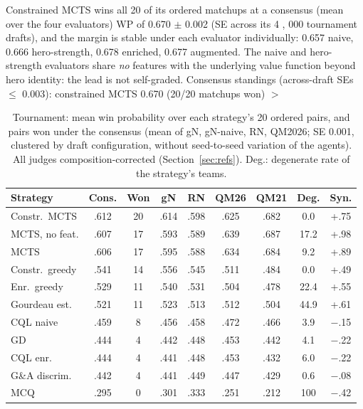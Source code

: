 \documentclass[journal]{IEEEtran}
\providecommand{\DIFaddtex}[1]{{\protect\color{blue} \sf #1}} %
\providecommand{\DIFdeltex}[1]{{\protect\color{red} \scriptsize #1}} %
\providecommand{\DIFaddbegin}{} %
\providecommand{\DIFdelbegin}{} %
\providecommand{\DIFdelend}{} %
\providecommand{\DIFaddFL}[1]{\DIFadd{#1}} %
\providecommand{\DIFadd}[1]{\texorpdfstring{\DIFaddtex{#1}}{#1}} %
\providecommand{\DIFdel}[1]{\texorpdfstring{\DIFdeltex{#1}}{}} %
\begin{document}
\DIFdelbegin \DIFdel{Constrained MCTS wins all 20 of its ordered matchups at a consensus (mean over the four evaluators) WP of 0.670 $\pm$ 0.002 (SE across its 4}%
\DIFdel{, }%
\DIFdel{000 tournament drafts), and the margin is stable under each evaluator individually: 0.657 naive, 0.666 hero-strength, 0.678 enriched, 0.677 augmented. The naive and hero-strength evaluators share \textit{no} features with the underlying value function beyond hero identity: the lead is not self-graded.
Consensus standings (across-draft SEs $\leq$ 0.003): constrained MCTS 0.670 (20/20 matchups won) $>$ }\DIFdelend \DIFaddbegin \begin{table}[t]
\centering
\caption{\DIFaddFL{Tournament: mean win probability over each strategy's 20 ordered pairs, and pairs won under the consensus (mean of gN, gN-naive, RN, QM2026; SE 0.001, clustered by draft configuration, without seed-to-seed variation of the agents). All judges composition-corrected (Section~\ref{sec:refs}). Deg.: degenerate rate of the strategy's teams.}}
\label{tab:tourn}
\setlength{\tabcolsep}{1.8pt}
\small
\begin{tabular}{lcccccccc}
\toprule
Strategy & Cons. & Won & gN & RN & QM26 & QM21 & Deg. & Syn. \\
\midrule
Constr.\ MCTS & .612 & 20 & .614 & .598 & .625 & .682 & 0.0 & +.75 \\
MCTS, no feat. & .607 & 17 & .593 & .589 & .639 & .687 & 17.2 & +.98 \\
MCTS & .606 & 17 & .595 & .588 & .634 & .684 & 9.2 & +.89 \\
Constr.\ greedy & .541 & 14 & .556 & .545 & .511 & .484 & 0.0 & +.49 \\
Enr.\ greedy & .529 & 11 & .540 & .531 & .504 & .478 & 22.4 & +.55 \\
Gourdeau est. & .521 & 11 & .523 & .513 & .512 & .504 & 44.9 & +.61 \\
CQL naive & .459 & 8 & .456 & .458 & .472 & .466 & 3.9 & $-$.15 \\
GD & .444 & 4 & .442 & .448 & .453 & .442 & 4.1 & $-$.22 \\
CQL enr. & .444 & 4 & .441 & .448 & .453 & .432 & 6.0 & $-$.22 \\
G\&A discrim. & .442 & 4 & .441 & .449 & .447 & .429 & 0.6 & $-$.08 \\
MCQ & .295 & 0 & .301 & .333 & .251 & .212 & 100 & $-$.42 \\
\bottomrule
\end{tabular}
\end{table}
\end{document}
